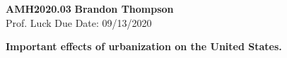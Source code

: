 \noindent
\textbf{AMH2020.03} \hfill \textbf{Brandon Thompson} \\
\normalsize Prof. Luck \hfill Due Date: 09/13/2020 \\

\begin{center}
\textbf{Important effects of urbanization on the United States.}
\end{center}